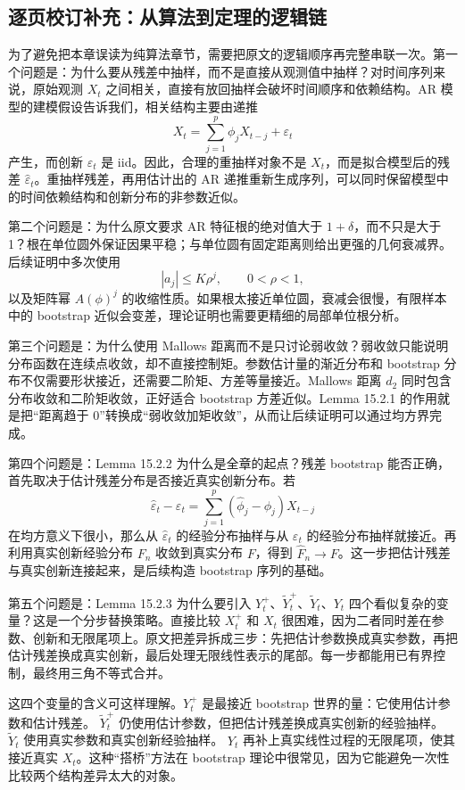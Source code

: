 \documentclass[11pt,a4paper,openany]{ctexbook}
\begin{document}
\subsection{逐页校订补充：从算法到定理的逻辑链}

为了避免把本章误读为纯算法章节，需要把原文的逻辑顺序再完整串联一次。第一个问题是：为什么要从残差中抽样，而不是直接从观测值中抽样？对时间序列来说，原始观测 \(X_t\) 之间相关，直接有放回抽样会破坏时间顺序和依赖结构。AR 模型的建模假设告诉我们，相关结构主要由递推
\[
  X_t=\sum_{j=1}^p\phi_jX_{t-j}+\varepsilon_t
\]
产生，而创新 \(\varepsilon_t\) 是 iid。因此，合理的重抽样对象不是 \(X_t\)，而是拟合模型后的残差 \(\hat\varepsilon_t\)。重抽样残差，再用估计出的 AR 递推重新生成序列，可以同时保留模型中的时间依赖结构和创新分布的非参数近似。

第二个问题是：为什么原文要求 AR 特征根的绝对值大于 \(1+\delta\)，而不只是大于 1？根在单位圆外保证因果平稳；与单位圆有固定距离则给出更强的几何衰减界。后续证明中多次使用
\[
  |a_j|\le K\rho^j,\qquad 0<\rho<1,
\]
以及矩阵幂 \(A(\phi)^j\) 的收缩性质。如果根太接近单位圆，衰减会很慢，有限样本中的 bootstrap 近似会变差，理论证明也需要更精细的局部单位根分析。

第三个问题是：为什么使用 Mallows 距离而不是只讨论弱收敛？弱收敛只能说明分布函数在连续点收敛，却不直接控制矩。参数估计量的渐近分布和 bootstrap 分布不仅需要形状接近，还需要二阶矩、方差等量接近。Mallows 距离 \(d_2\) 同时包含分布收敛和二阶矩收敛，正好适合 bootstrap 方差近似。Lemma 15.2.1 的作用就是把“距离趋于 0”转换成“弱收敛加矩收敛”，从而让后续证明可以通过均方界完成。

第四个问题是：Lemma 15.2.2 为什么是全章的起点？残差 bootstrap 能否正确，首先取决于估计残差分布是否接近真实创新分布。若
\[
  \hat\varepsilon_t-\varepsilon_t
  =\sum_{j=1}^p(\hat\phi_j-\phi_j)X_{t-j}
\]
在均方意义下很小，那么从 \(\hat\varepsilon_t\) 的经验分布抽样与从 \(\varepsilon_t\) 的经验分布抽样就接近。再利用真实创新经验分布 \(F_n\) 收敛到真实分布 \(F\)，得到 \(\hat F_n\to F\)。这一步把估计残差与真实创新连接起来，是后续构造 bootstrap 序列的基础。

第五个问题是：Lemma 15.2.3 为什么要引入 \(Y_t^+\)、\(\widetilde Y_t^+\)、\(\widetilde Y_t\)、\(Y_t\) 四个看似复杂的变量？这是一个分步替换策略。直接比较 \(X_t^+\) 和 \(X_t\) 很困难，因为二者同时差在参数、创新和无限尾项上。原文把差异拆成三步：先把估计参数换成真实参数，再把估计残差换成真实创新，最后处理无限线性表示的尾部。每一步都能用已有界控制，最终用三角不等式合并。

这四个变量的含义可这样理解。\(Y_t^+\) 是最接近 bootstrap 世界的量：它使用估计参数和估计残差。 \(\widetilde Y_t^+\) 仍使用估计参数，但把估计残差换成真实创新的经验抽样。 \(\widetilde Y_t\) 使用真实参数和真实创新经验抽样。 \(Y_t\) 再补上真实线性过程的无限尾项，使其接近真实 \(X_t\)。这种“搭桥”方法在 bootstrap 理论中很常见，因为它能避免一次性比较两个结构差异太大的对象。
\end{document}
